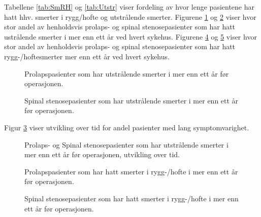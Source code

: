 \documentclass [norsk,a4paper,twoside]{article}\usepackage[]{graphicx}\usepackage[]{color}
\begin{document}
Tabellene \ref{tab:SmRH}  og \ref{tab:Utstr} viser fordeling av hvor lenge pasientene har hatt 
hhv. smerter i rygg/hofte og utstrålende smerter. 
Figurene \ref{fig:VarighSmerteUtstrAvdPro} og \ref{fig:VarighSmerteUtstrAvdSS} viser hvor stor andel av henholdsvis prolaps- og spinal stenosepasienter som har hatt ustrålende smerter i mer enn ett år ved hvert sykehus. 
Figurene \ref{fig:VarighSmerteRyggAvdPro} og \ref{fig:VarighSmerteRyggAvdSS} viser hvor stor andel av henholdsvis prolaps- og spinal stenosepasienter som har hatt rygg-/hoftesmerter mer enn ett år ved hvert sykehus.

\begin{figure}[h] 
\caption{Prolapspasienter som har utstrålende smerter i mer enn ett år før operasjonen.}
\label{fig:VarighSmerteUtstrAvdPro}
\end{figure}

\begin{figure}[h] 
\caption{Spinal stenosepasienter som har utstrålende smerter i mer enn ett år før operasjonen.}
\label{fig:VarighSmerteUtstrAvdSS}
\end{figure}

Figur \ref{fig:VarighSmerteUtstrTid} viser utvikling over tid for andel pasienter med lang symptomvarighet. 

\begin{figure}[h] 
\caption{Prolaps- og Spinal stenosepasienter som har utstrålende smerter i mer enn ett år før operasjonen, utvikling over tid.}
\label{fig:VarighSmerteUtstrTid}
\end{figure}



\begin{figure}[h] 
\caption{Prolapspasienter som har hatt smerter i rygg-/hofte
i mer enn ett år før operasjonen.}
\label{fig:VarighSmerteRyggAvdPro}
\end{figure}

\begin{figure}[h] 
\caption{Spinal stenosepasienter som har hatt smerter i rygg-/hofte
i mer enn ett år før operasjonen.}
\label{fig:VarighSmerteRyggAvdSS}
\end{figure}
\end{document}
